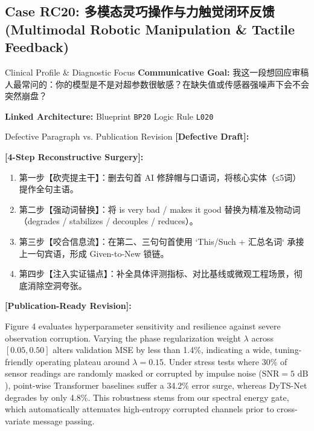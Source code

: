\subsection{Case RC20: 多模态灵巧操作与力触觉闭环反馈 (Multimodal Robotic Manipulation \& Tactile Feedback)}\label{case:RC20}
\begin{ConceptBox}{Clinical Profile \& Diagnostic Focus}
\textbf{Communicative Goal:} 我这一段想回应审稿人最常问的：你的模型是不是对超参数很敏感？在缺失值或传感器强噪声下会不会突然崩盘？\par
\textbf{Linked Architecture:} Blueprint \texttt{BP20} \enspace\textbar\enspace Logic Rule \texttt{L020}
\end{ConceptBox}
\begin{ExampleBox}{Defective Paragraph vs. Publication Revision}
\textbf{\color{TargetHighlight}[Defective Draft]:}\par
{}\par\vspace{6pt}
\textbf{\color{AcadForest}[4-Step Reconstructive Surgery]:}
\begin{enumerate}[label=\textbf{\color{AcadNavy}Step \arabic*:}, leftmargin=2em]
  \item 第一步【砍壳提主干】：删去句首 AI 修辞帽与口语词，将核心实体（≤5词）提作全句主语。
  \item 第二步【强动词替换】：将 is very bad / makes it good 替换为精准及物动词（degrades / stabilizes / decouples / reduces）。
  \item 第三步【咬合信息流】：在第二、三句句首使用 `This/Such + 汇总名词` 承接上一句宾语，形成 Given-to-New 锁链。
  \item 第四步【注入实证锚点】：补全具体评测指标、对比基线或微观工程场景，彻底消除空洞夸张。
\end{enumerate}\vspace{4pt}
\textbf{\color{AcadNavy}[Publication-Ready Revision]:}\par
Figure 4 evaluates hyperparameter sensitivity and resilience against severe observation corruption. Varying the phase regularization weight $\lambda$ across $[0.05, 0.50]$ alters validation MSE by less than 1.4\%, indicating a wide, tuning-friendly operating plateau around $\lambda=0.15$. Under stress tests where 30\% of sensor readings are randomly masked or corrupted by impulse noise ($\text{SNR} = 5\text{ dB}$), point-wise Transformer baselines suffer a 34.2\% error surge, whereas DyTS-Net degrades by only 4.8\%. This robustness stems from our spectral energy gate, which automatically attenuates high-entropy corrupted channels prior to cross-variate message passing.
\end{ExampleBox}
